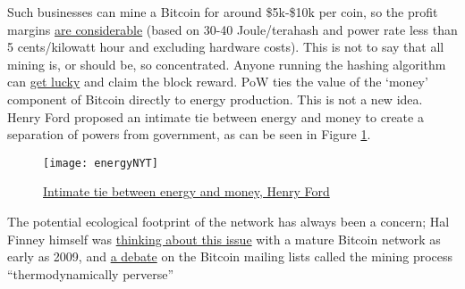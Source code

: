 Such businesses can mine a Bitcoin for around \$5k-\$10k per coin, so the profit margins \href{https://www.nicehash.com/profitability-calculator}{are considerable} (based on 30-40 Joule/terahash and power rate less than 5 cents/kilowatt hour and excluding hardware costs). This is not to say that all mining is, or should be, so concentrated. Anyone running the hashing algorithm can \href{https://twitter.com/ckpooldev/status/1485585814419812356}{get lucky} and claim the block reward. PoW ties the value of the `money' component of Bitcoin directly to energy production. This is not a new idea. Henry Ford proposed an intimate tie between energy and money to create a separation of powers from government, as can be seen in Figure \ref{fig:energyNYT}.\
\begin{figure}
  \centering
    \texttt{[image: energyNYT]}
  \caption{\href{https://www.nytimes.com/1921/12/06/archives/mr-fords-energy-dollar.html}{Intimate tie between energy and money, Henry Ford}}
  \label{fig:energyNYT}
\end{figure}
The potential ecological footprint of the network has always been a concern; Hal Finney himself was \href{https://twitter.com/halfin/status/1153096538}{thinking about this issue} with a mature Bitcoin network as early as 2009, and \href{https://satoshi.nakamotoinstitute.org/posts/bitcointalk/threads/167/#35}{a debate} on the Bitcoin mailing lists called the mining process ``thermodynamically perverse'' \par
